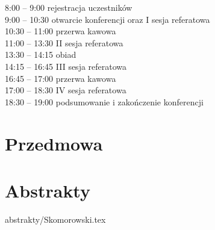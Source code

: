 \documentclass[12pt,oneside]{book}
\begin{document}
\Large{8:00 – 9:00 rejestracja uczestników\\
9:00 – 10:30 otwarcie konferencji oraz I sesja referatowa\\
10:30 – 11:00 przerwa kawowa\\
11:00 – 13:30 II  sesja referatowa \\
13:30 – 14:15 obiad\\
14:15 – 16:45 III sesja referatowa\\
16:45 – 17:00 przerwa kawowa\\
17:00 – 18:30 IV sesja referatowa\\
18:30 – 19:00 podsumowanie i zakończenie konferencji}

%
\chapter{Przedmowa}


\large{
\tableofcontents
}
\mainmatter

\pagestyle{mainmatter}%


\chapter{Abstrakty}
\large
\vspace{-0.5cm}
 \label{bielecki}
\newpage
 \label{bilinska}
\newpage
 \label{cybulski}
\newpage
 \label{dziembor}
\newpage
 \label{franczyk}
\newpage
 \label{guzik}
\newpage
 \label{kendzierski}
\newpage
 \label{kolendowicz}
\newpage
 \label{kupczyk}
\newpage
 \label{pilguj}
\newpage 	
 \label{plewa}
\newpage 	
 \label{poreba}
\newpage 	
 {abstrakty/Skomorowski.tex} \label{skomorowski}
\newpage
 \label{sekowski}
\newpage
 \label{solecki}
\newpage
 \label{swider}
\newpage
 \label{taszarek}
\newpage
 \label{pawliczek}
\newpage
 \label{piasecki}
\newpage
 \label{radziun}
\newpage
 \label{sypniewski}
\newpage
 \label{wieczorek}
\newpage
 \label{wilk}
\newpage
\end{document}
